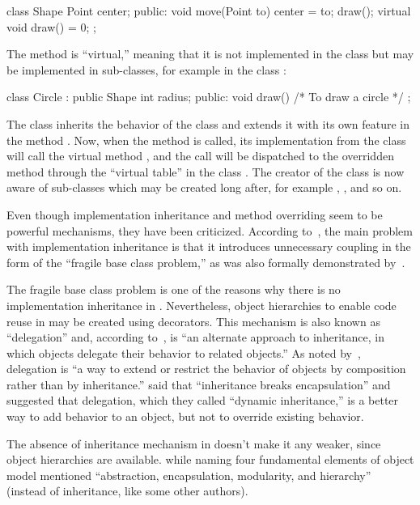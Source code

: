 \begin{ffcode}
class Shape {
  Point center;
public:
  void move(Point to) { center = to; draw(); }
  virtual void draw() = 0;
};
\end{ffcode}

The method  is ``virtual,'' meaning that it is not implemented in the class
 but may be implemented in sub-classes, for example in
the class :

\begin{ffcode}
class Circle : public Shape {
  int radius;
public:
  void draw() { /* To draw a circle */ }
};
\end{ffcode}

The class  inherits the behavior of the class  and
extends it with its own feature in the method . Now, when the
method  is called, its implementation from the class 
will call the virtual method , and the call will be dispatched
to the overridden method  through the ``virtual table'' in the class .
The creator of the class  is now aware of sub-classes
which may be created long after, for example , , and so on.

Even though implementation inheritance and method overriding seem to
be powerful mechanisms, they have been criticized.
According to~\citet{holub2003extends}, the main problem with
implementation inheritance is that it introduces unnecessary coupling
in the form of the ``fragile base class problem,''
as was also formally demonstrated by~\citet{mikhajlov1998study}.

The fragile base class problem is one of the reasons why
there is no implementation inheritance in \phic{}.
Nevertheless, object hierarchies to enable code reuse
in \phic{} may be created using decorators.
This mechanism is also known as ``delegation'' and, according
to~\citet[p.98]{grady2007object}, is ``an alternate approach to inheritance, in which
objects delegate their behavior to related objects.''
As noted by~\citet[p.139]{west2004object}, delegation is ``a way to extend or restrict
the behavior of objects by composition rather than by inheritance.''
\citet{seiter1998evolution} said that ``inheritance breaks encapsulation'' and suggested that
delegation, which they called ``dynamic inheritance,'' is a better way
to add behavior to an object, but not to override existing behavior.

The absence of inheritance mechanism in \phic{} doesn't make it
any weaker, since object hierarchies are available. \citet{grady2007object}
while naming four fundamental elements of object model mentioned
``abstraction, encapsulation, modularity, and hierarchy'' (instead of inheritance, like
some other authors).

